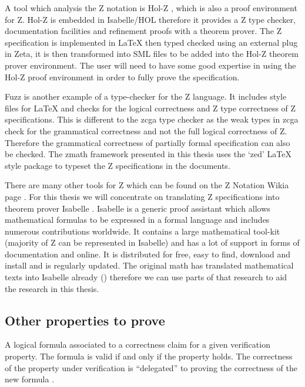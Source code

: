 A tool which analysis the Z notation is Hol-Z \cite{hol-z}, which is also a proof environment for Z. Hol-Z is embedded in Isabelle/HOL therefore it provides a Z type checker, documentation facilities and refinement proofs with a theorem prover. The Z specification is implemented in \LaTeX{} then typed checked using an external plug in Zeta, it is then transformed into SML files to be added into the Hol-Z theorem prover environment. The user will need to have some good expertise in using the Hol-Z proof environment in order to fully prove the specification.

Fuzz \cite{spiveyfuzz} is another example of a type-checker for the Z language. It includes style files for \LaTeX{} and checks for the logical correctness and Z type correctness of Z specifications. This is different to the \gls{zcga} type checker as the weak types in \gls{zcga} check for the grammatical correctness and not the full logical correctness of Z. Therefore the grammatical correctness of partially formal specification can also be checked. The \gls{zmath} framework presented in this thesis uses the `zed' \LaTeX{} style package to typeset the Z specifications in the documents.

There are many other tools for Z which can be found on the Z Notation Wikia page \cite{zwikia}. For this thesis we will concentrate on translating Z specifications into theorem prover Isabelle \cite{isabelle}. Isabelle is a generic proof assistant which allows mathematical formulas to be expressed in a formal language and includes numerous contributions worldwide. It contains a large mathematical tool-kit (majority of Z can be represented in Isabelle) and has a lot of support in forms of documentation and online. It is distributed for free, easy to find, download and install and is regularly updated. The original \gls{math} has translated mathematical texts into Isabelle already (\cite{mathintoisa}) therefore we can use parts of that research to aid the research in this thesis.

\subsection{Other properties to prove}
\label{subsec:propertiestoprove}

\begin{defin}
A logical formula associated to a correctness claim for a given verification property. The formula is valid if and only if the property holds. The correctness of the property under verification is “delegated” to proving the correctness of the new formula \cite{handbookofembed}.
\end{defin}

